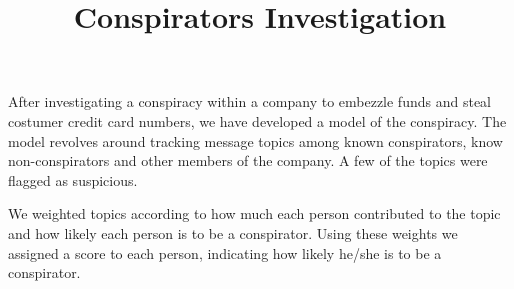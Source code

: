 \documentclass{icmmcm}
\title{Conspirators Investigation}
\begin{document}

\begin{summary}

After investigating a conspiracy within a company to embezzle funds and steal costumer credit card numbers, we have developed a model of the conspiracy.  The model revolves around tracking message topics among known conspirators, know non-conspirators and other members of the company.  A few of the topics were flagged as suspicious.

We weighted topics according to how much each person contributed to the topic and how likely each person is to be a conspirator.  Using these weights we assigned a score to each person, indicating how likely he/she is to be a conspirator. 
\\\\


\end{summary}
\end{document}
